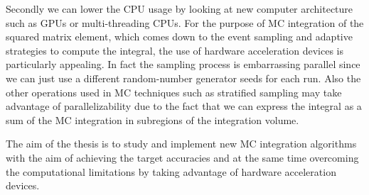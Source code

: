 \documentclass[../main/main.tex]{subfiles}
\begin{document}
Secondly we can lower the CPU usage by looking at new computer architecture such as GPUs or multi-threading CPUs.
 For the purpose of MC integration of the squared matrix element, which comes down to the event sampling and adaptive strategies to compute
 the integral, the use of hardware acceleration devices is particularly appealing. In fact the sampling process is embarrassing parallel since we can
 just use a different random-number generator seeds for each run. Also the other operations used in MC techniques such as stratified sampling may
 take advantage of parallelizability due to the fact that we can express the integral as a sum of the MC integration in subregions of the integration volume.
 
 The aim of the thesis is to study and implement new MC integration algorithms with the aim of achieving the target accuracies and at the same time overcoming the computational limitations by taking advantage of hardware acceleration devices.

























 


 
\end{document}
